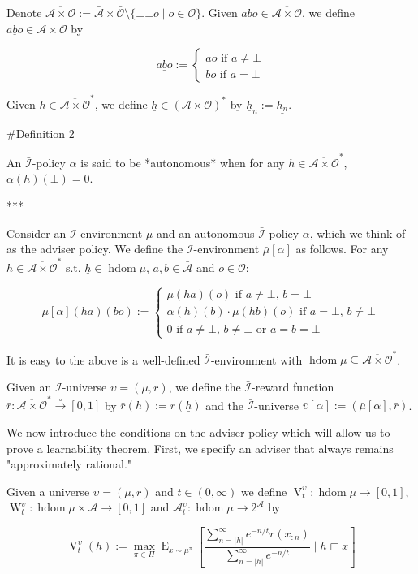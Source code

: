 \documentclass[a4paper]{article}
\DeclareMathOperator{\E}{E}
\newcommand{\Abs}[1]{\lvert #1 \rvert}
\newcommand{\PF}{\xrightarrow{\circ}}
\newcommand{\Ob}{\mathcal{O}}
\newcommand{\A}{\mathcal{A}}
\newcommand{\I}{\mathcal{I}}
\newcommand{\FH}{(\A \times \Ob)^*}
\newcommand{\Ado}{\bar{\Ob}}
\newcommand{\Ada}{\bar{\A}}
\newcommand{\Adi}{\bar{\I}}
\newcommand{\Adao}{\overline{\A \times \Ob}}
\newcommand{\Adfh}{\Adao^*}
\DeclareMathOperator{\HD}{hdom}
\newcommand{\V}{\operatorname{V}}
\newcommand{\W}{\operatorname{W}}
\begin{document}
Denote $\Adao:= \Ada \times \Ado \setminus \{\bot\bot o \mid o \in \Ob\}$. Given $abo \in \Adao$, we define $\underline{abo} \in \A \times \Ob$ by

$$\underline{abo}:=\begin{cases} ao \text{ if } a\ne\bot \\ bo \text{ if } a=\bot \end{cases}$$

Given $h \in \Adfh$, we define $\underline{h} \in \FH$ by $\underline{h}_n:=\underline{h_n}$. 

\#Definition 2

An $\Adi$-policy $\alpha$ is said to be *autonomous* when for any $h \in \Adfh$, $\alpha(h)(\bot)=0$.

***

Consider an $\I$-environment $\mu$ and an autonomous $\Adi$-policy $\alpha$, which we think of as the adviser policy. We define the $\Adi$-environment $\bar{\mu}[\alpha]$ as follows. For any $h \in \Adfh$ s.t. $\underline{h} \in \HD \mu$, $a,b \in \Ada$ and $o \in \Ob$:

$$\bar{\mu}[\alpha](ha)(bo):=\begin{cases} \mu(\underline{h}a)(o) \text{ if } a\ne\bot,\, b=\bot \\ \alpha(h)(b)\cdot\mu(\underline{h}b)(o) \text{ if } a=\bot,\,b\ne\bot \\ 0 \text{ if } a\ne\bot,\, b\ne\bot \text{ or } a=b=\bot \end{cases}$$

It is easy to the above is a well-defined $\Adi$-environment with $\HD \mu \subseteq \Adfh$. 

Given an $\I$-universe $\upsilon=(\mu,r)$, we define the $\Adi$-reward function $\bar{r}: \Adfh \PF [0,1]$ by $\bar{r}(h):=r(\underline{h})$ and the $\Adi$-universe $\bar{\upsilon}[\alpha]:=(\bar{\mu}[\alpha],\bar{r})$.

We now introduce the conditions on the adviser policy which will allow us to prove a learnability theorem. First, we specify an adviser that always remains "approximately rational."

Given a universe $\upsilon=(\mu,r)$ and $t \in (0, \infty)$ we define $\V_t^\upsilon: \HD{\mu} \rightarrow [0,1]$, $\W_t^\upsilon: \HD{\mu} \times \A \rightarrow [0,1]$ and $\A^\upsilon_t: \HD{\mu} \rightarrow 2^\A$ by

$$\V_t^\upsilon(h):=\max_{\pi \in \Pi} {\E_{x \sim \mu^\pi}[\frac{\sum_{n=\Abs{h}}^\infty e^{-n/t} r(x_{:n})}{\sum_{n=\Abs{h}}^\infty e^{-n/t}} \mid h \sqsubset x]}$$
\end{document}
